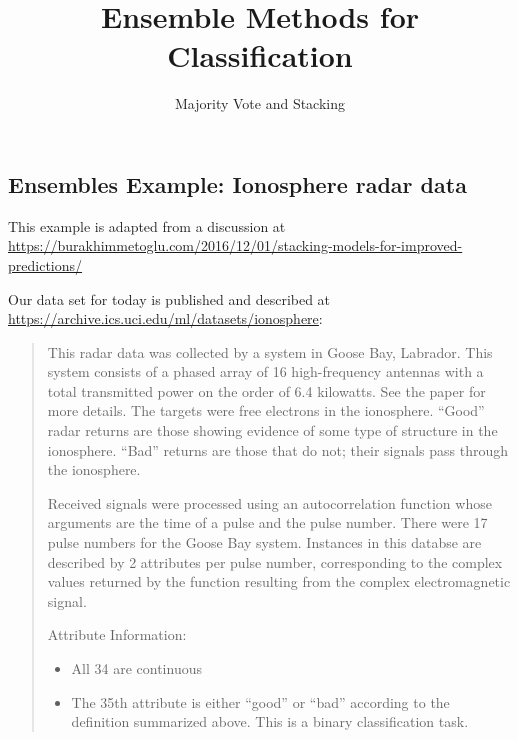 \documentclass[]{article}
\title{Ensemble Methods for Classification}
\subtitle{Majority Vote and Stacking}
\author{}
\date{}
\providecommand{\tightlist}{%
  \setlength{\itemsep}{0pt}\setlength{\parskip}{0pt}}
\begin{document}
\maketitle

\hypertarget{ensembles-example-ionosphere-radar-data}{%
\subsection{Ensembles Example: Ionosphere radar
data}\label{ensembles-example-ionosphere-radar-data}}

This example is adapted from a discussion at
\url{https://burakhimmetoglu.com/2016/12/01/stacking-models-for-improved-predictions/}

Our data set for today is published and described at
\url{https://archive.ics.uci.edu/ml/datasets/ionosphere}:

\begin{quote}
This radar data was collected by a system in Goose Bay, Labrador. This
system consists of a phased array of 16 high-frequency antennas with a
total transmitted power on the order of 6.4 kilowatts. See the paper for
more details. The targets were free electrons in the ionosphere.
``Good'' radar returns are those showing evidence of some type of
structure in the ionosphere. ``Bad'' returns are those that do not;
their signals pass through the ionosphere.

Received signals were processed using an autocorrelation function whose
arguments are the time of a pulse and the pulse number. There were 17
pulse numbers for the Goose Bay system. Instances in this databse are
described by 2 attributes per pulse number, corresponding to the complex
values returned by the function resulting from the complex
electromagnetic signal.

Attribute Information:

\begin{itemize}
\tightlist
\item
  All 34 are continuous
\item
  The 35th attribute is either ``good'' or ``bad'' according to the
  definition summarized above. This is a binary classification task.
\end{itemize}
\end{quote}
\end{document}
